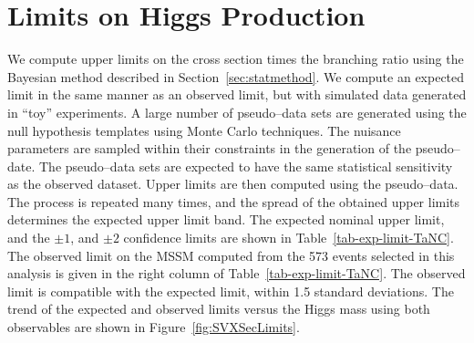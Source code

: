 \section{Limits on Higgs Production}
We compute upper limits on the cross section times the branching ratio using the
Bayesian method described in Section~\ref{sec:statmethod}. We compute an
expected limit in the same manner as an observed limit, but with simulated data
generated in ``toy'' experiments.  A large number of pseudo--data sets are
generated using the null hypothesis templates using Monte Carlo techniques. The
nuisance parameters are sampled within their constraints in the generation of
the pseudo--date.  The pseudo--data sets are expected to have the same
statistical sensitivity as the observed dataset.  Upper limits are then
computed using the pseudo--data.  The process is repeated many times, and the
spread of the obtained upper limits determines the expected upper limit band.
The expected nominal upper limit, and the $\pm1$, and $\pm2$ confidence limits
are shown in Table~\ref{tab-exp-limit-TaNC}.  The observed limit on the MSSM
computed from the 573 events selected in this analysis is given in the right
column of Table~\ref{tab-exp-limit-TaNC}.  The observed limit is compatible with
the expected limit, within 1.5 standard deviations.  The trend of the expected
and observed limits versus the Higgs mass using both observables are shown in
Figure~\ref{fig:SVXSecLimits}.  
%
%
